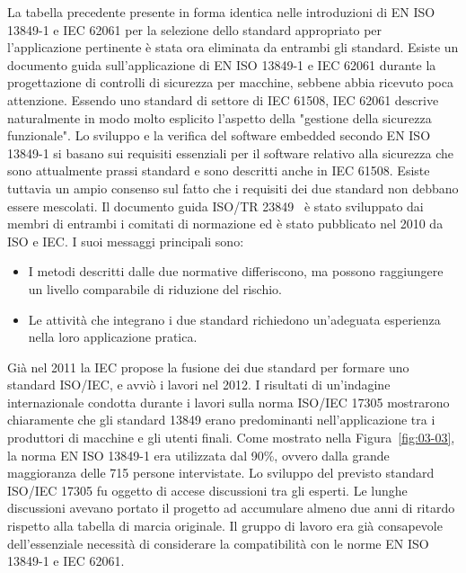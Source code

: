 La tabella precedente presente in forma identica nelle introduzioni di EN ISO 13849-1 e IEC 62061 per la selezione dello standard appropriato per l'applicazione pertinente è stata ora eliminata da entrambi gli standard. Esiste un documento guida sull'applicazione di EN ISO 13849-1 e IEC 62061 durante la progettazione di controlli di sicurezza per macchine, sebbene abbia ricevuto poca attenzione. Essendo uno standard di settore di IEC 61508, IEC 62061 descrive naturalmente in modo molto esplicito l'aspetto della "gestione della sicurezza funzionale". Lo sviluppo e la verifica del software embedded secondo EN ISO 13849-1 si basano sui requisiti essenziali per il software relativo alla sicurezza che sono attualmente prassi standard e sono descritti anche in IEC 61508. Esiste tuttavia un ampio consenso sul fatto che i requisiti dei due standard non debbano essere mescolati. Il documento guida ISO/TR 23849~\cite{isotr23849} è stato sviluppato dai membri di entrambi i comitati di normazione ed è stato pubblicato nel 2010 da ISO e IEC. I suoi messaggi principali sono:
\begin{itemize}
    \item I metodi descritti dalle due normative differiscono, ma possono raggiungere un livello comparabile di riduzione del rischio.
    \item Le attività che integrano i due standard richiedono un'adeguata esperienza nella loro applicazione pratica.
\end{itemize}
Già nel 2011 la IEC propose la fusione dei due standard per formare uno standard ISO/IEC, e avviò i lavori nel 2012. I risultati di un'indagine internazionale condotta durante i lavori sulla norma ISO/IEC 17305 mostrarono chiaramente che gli standard 13849 erano predominanti nell'applicazione tra i produttori di macchine e gli utenti finali. Come mostrato nella Figura~\ref{fig:03-03}, la norma EN ISO 13849-1 era utilizzata dal 90\%, ovvero dalla grande maggioranza delle 715 persone intervistate. Lo sviluppo del previsto standard ISO/IEC 17305 fu oggetto di accese discussioni tra gli esperti. Le lunghe discussioni avevano portato il progetto ad accumulare almeno due anni di ritardo rispetto alla tabella di marcia originale. Il gruppo di lavoro era già consapevole dell'essenziale necessità di considerare la compatibilità con le norme EN ISO 13849-1 e IEC 62061. 

